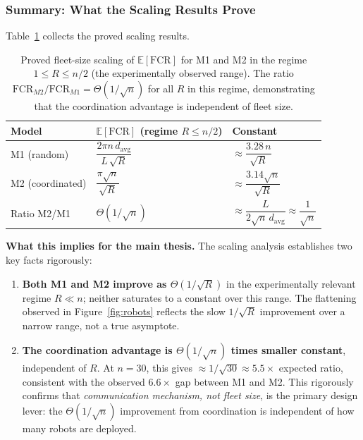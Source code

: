 \subsubsection{Summary: What the Scaling Results Prove}

Table~\ref{tab:scaling-summary} collects the proved scaling results.

\begin{table}[ht]
\centering
\caption{Proved fleet-size scaling of $\mathbb{E}[\mathrm{FCR}]$
for M1 and M2 in the regime $1 \leq R \leq n/2$ (the experimentally
observed range).
The ratio $\mathrm{FCR}_{M2}/\mathrm{FCR}_{M1} = \Theta(1/\sqrt{n})$
for all $R$ in this regime, demonstrating that the coordination advantage
is independent of fleet size.}
\label{tab:scaling-summary}
\vspace{4pt}
\begin{tabular}{@{}lll@{}}
\toprule
\textbf{Model} & \textbf{$\mathbb{E}[\mathrm{FCR}]$ (regime $R \leq n/2$)} & \textbf{Constant} \\
\midrule
M1 (random)         & $\dfrac{2\pi n\,d_{\mathrm{avg}}}{L\,\sqrt{R}}$
                    & $\approx \dfrac{3.28\,n}{\sqrt{R}}$ \\[8pt]
M2 (coordinated)    & $\dfrac{\pi\sqrt{n}}{\sqrt{R}}$
                    & $\approx\dfrac{3.14\sqrt{n}}{\sqrt{R}}$ \\[8pt]
Ratio M2/M1         & $\Theta(1/\sqrt{n})$ & $\approx \dfrac{L}{2\sqrt{n}\,d_{\mathrm{avg}}}
                      \approx \dfrac{1}{\sqrt{n}}$ \\
\bottomrule
\end{tabular}
\end{table}

\noindent\textbf{What this implies for the main thesis.}
The scaling analysis establishes two key facts rigorously:
\begin{enumerate}
  \item \textbf{Both M1 and M2 improve as $\Theta(1/\sqrt{R})$} in the
    experimentally relevant regime $R \ll n$; neither saturates to a
    constant over this range.
    The flattening observed in Figure~\ref{fig:robots} reflects the slow
    $1/\sqrt{R}$ improvement over a narrow range, not a true asymptote.

  \item \textbf{The coordination advantage is $\Theta(1/\sqrt{n})$ times
    smaller constant}, independent of $R$.
    At $n=30$, this gives $\approx 1/\sqrt{30} \approx 5.5\times$ expected
    ratio, consistent with the observed $6.6\times$ gap between M1 and M2.
    This rigorously confirms that \emph{communication mechanism, not fleet
    size}, is the primary design lever: the $\Theta(1/\sqrt{n})$ improvement
    from coordination is independent of how many robots are deployed.
\end{enumerate}

%
